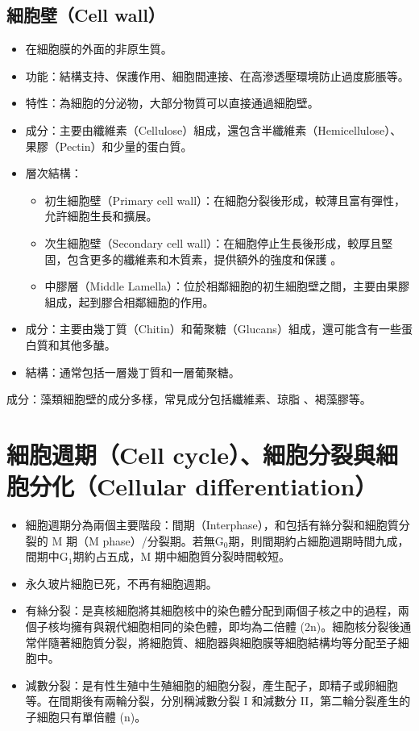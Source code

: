 \documentclass[a4paper,12pt]{report}
\begin{document}
\subsection{細胞壁（Cell wall）}
\begin{itemize}
  \item 在細胞膜的外面的非原生質。
  \item 功能：結構支持、保護作用、細胞間連接、在高滲透壓環境防止過度膨脹等。
  \item 特性：為細胞的分泌物，大部分物質可以直接通過細胞壁。
  \end{itemize}
  \begin{itemize}
    \item 成分：主要由纖維素（Cellulose）組成，還包含半纖維素（Hemicellulose）、果膠（Pectin）和少量的蛋白質。
    \item 層次結構：
    \begin{itemize}
    \item 初生細胞壁（Primary cell wall）：在細胞分裂後形成，較薄且富有彈性，允許細胞生長和擴展。
    \item 次生細胞壁（Secondary cell wall）：在細胞停止生長後形成，較厚且堅固，包含更多的纖維素和木質素，提供額外的強度和保護 。
    \item 中膠層（Middle Lamella）：位於相鄰細胞的初生細胞壁之間，主要由果膠組成，起到膠合相鄰細胞的作用。
    \end{itemize}
    \end{itemize}
  \begin{itemize}
    \item 成分：主要由幾丁質（Chitin）和葡聚糖（Glucans）組成，還可能含有一些蛋白質和其他多醣。
    \item 結構：通常包括一層幾丁質和一層葡聚糖。
\end{itemize}
成分：藻類細胞壁的成分多樣，常見成分包括纖維素、琼脂 、褐藻膠等。
\section{細胞週期（Cell cycle）、細胞分裂與細胞分化（Cellular differentiation）}
\begin{itemize}
  \item 細胞週期分為兩個主要階段：間期（Interphase），和包括有絲分裂和細胞質分裂的 M 期（M phase）/分裂期。若無G$_0$期，則間期約占細胞週期時間九成，間期中G$_1$期約占五成，M 期中細胞質分裂時間較短。
  \item 永久玻片細胞已死，不再有細胞週期。
  \item 有絲分裂：是真核細胞將其細胞核中的染色體分配到兩個子核之中的過程，兩個子核均擁有與親代細胞相同的染色體，即均為二倍體 (2n)。細胞核分裂後通常伴隨著細胞質分裂，將細胞質、細胞器與細胞膜等細胞結構均等分配至子細胞中。
  \item 減數分裂：是有性生殖中生殖細胞的細胞分裂，產生配子，即精子或卵細胞等。在間期後有兩輪分裂，分別稱減數分裂 I 和減數分  II，第二輪分裂產生的子細胞只有單倍體 (n)。
\end{itemize}
\end{document}
